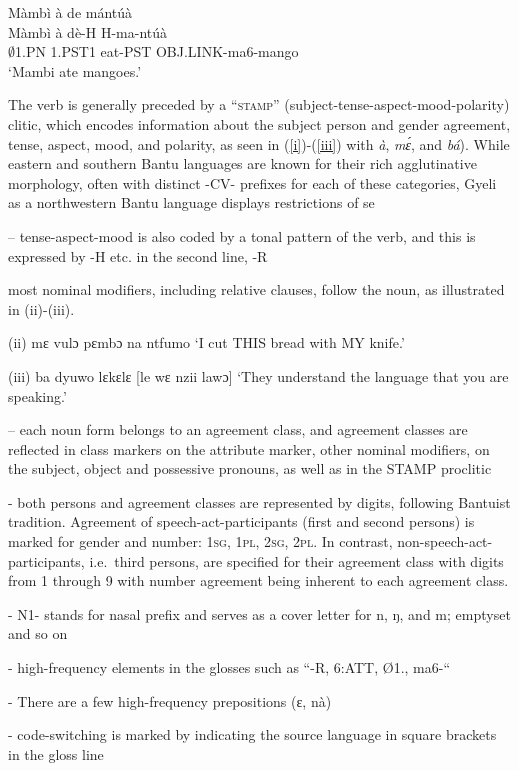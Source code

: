 \begin{exe}
\ex\label{i}
  \glll  Màmbì à de mántúà\\
	Màmbì à dè-H H-ma-ntúà \\
         $\emptyset$1.PN 1.PST1 eat-PST OBJ.LINK-ma6-mango   \\
    \trans `Mambi ate mangoes.'
\end{exe}

The verb is generally preceded by a ``\textsc{stamp}'' (subject-tense-aspect-mood-polarity) clitic, which encodes information about the subject person and gender agreement, tense, aspect, mood, and polarity, as seen in (\ref{i})-(\ref{iii}) with {\itshape à}, {\itshape mɛ́}, and {\itshape bá}). While eastern and southern Bantu languages are known for their rich agglutinative morphology, often with distinct -CV- prefixes for each of these categories, Gyeli as a northwestern Bantu language displays restrictions of se

– tense-aspect-mood is also coded by a tonal pattern of the verb, and this is expressed by -H etc. in the second line, -R



most nominal modifiers, including relative clauses, follow the noun, as illustrated in (ii)-(iii).

(ii) mɛ vulɔ pɛmbɔ na ntfumo
‘I cut THIS bread with MY knife.’

(iii) ba dyuwo lɛkɛlɛ [le wɛ nzii lawɔ]
‘They understand the language that you are speaking.’

– each noun form belongs to an agreement class, and agreement classes are reflected in class markers on the attribute marker, other nominal modifiers, on the subject, object and possessive pronouns, as well as in the STAMP proclitic

- both persons and agreement classes are represented by digits, following Bantuist tradition. Agreement of speech-act-participants (first and second persons) is marked for gender and number: 1\textsc{sg}, 1\textsc{pl}, 2\textsc{sg}, 2\textsc{pl}. In contrast, non-speech-act-participants, i.e.\ third persons, are specified for their agreement class with digits from 1 through 9 with number agreement being inherent to each agreement class. 

- N1- stands for nasal prefix and serves as a cover letter for n, ŋ, and m; emptyset and so on

- high-frequency elements in the glosses such as “-R, 6:ATT, Ø1., ma6-“

- There are a few high-frequency prepositions (ɛ, nà)

- code-switching is marked by indicating the source language in square brackets in the gloss line











